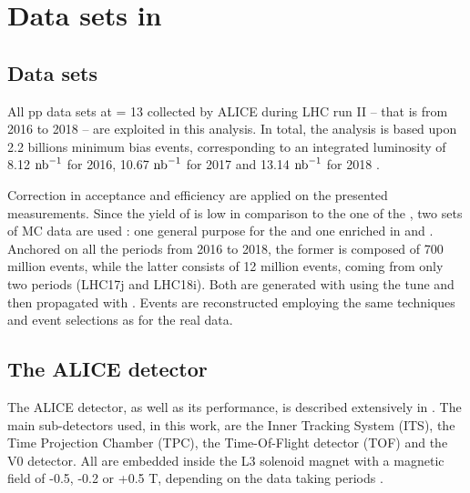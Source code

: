 \newpage
\section{Data sets in \pp}
\label{sec:Section02}

\subsection{Data sets}
\label{sec:Section02.a-}

All pp data sets at \sqrtS = 13 \tev collected by ALICE during LHC run II -- that is from 2016 to 2018 -- are exploited in this analysis. In total, the analysis is based upon 2.2 billions minimum bias events, corresponding to an integrated luminosity of 8.12 $\mbox{\ensuremath{\text{nb}}}^{-1}$ for 2016, 10.67 $\mbox{\ensuremath{\text{nb}}}^{-1}$ for 2017 and 13.14 $\mbox{\ensuremath{\text{nb}}}^{-1}$ for 2018 \cite{collaboration_alice_nodate}. 

Correction in acceptance and efficiency are applied on the presented measurements. Since the yield of \rmOmegaPM is low in comparison to the one of the \rmPhiMes, two sets of MC data are used : one general purpose for the \rmPhiMes and one enriched in \rmXiPM and \rmOmegaPM. Anchored on all the periods from 2016 to 2018, the former is composed of 700 million events, while the latter consists of 12 million events, coming from only two periods (LHC17j and LHC18i). Both are generated with \Pythiaeight using the \Monash tune and then propagated with \Geantfour. Events are reconstructed employing the same techniques and event selections as for the real data.

\subsection{The ALICE detector}
\label{sec:Section02.b-}

The ALICE detector, as well as its performance, is described extensively in \cite{collaboration_alice_2008} \cite{alice_collaboration_performance_2014}. The main sub-detectors used, in this work, are the Inner Tracking System (ITS), the Time Projection Chamber (TPC), the Time-Of-Flight detector (TOF) and the V0 detector. All are embedded inside the L3 solenoid magnet with a magnetic field of -0.5, -0.2 or +0.5 T, depending on the data taking periods \cite{noauthor_alidpgreconstructeddatatakingperiodspp13tev_nodate}.

